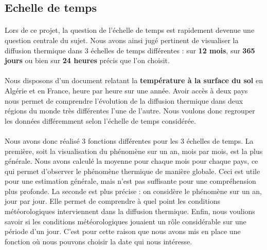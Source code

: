 \documentclass{article}
\begin{document}
\subsection{Echelle de temps}

\paragraph{}
Lors de ce projet, la question de l'échelle de temps est rapidement devenue une question centrale du sujet. Nous avons ainsi jugé pertinent de visualiser la diffusion thermique dans 3 échelles de temps différentes : sur \textbf{12 mois}, sur \textbf{365 jours} ou bien sur \textbf{24 heures} précis que l'on choisit.

\paragraph{}
Nous disposons d'un document relatant la \textbf{température à la surface du sol} en Algérie et en France, heure par heure sur une année. Avoir accès à deux pays nous permet de comprendre l'évolution de la diffusion thermique dans deux régions du monde très différentes l'une de l'autre. Nous voulons donc regrouper les données différemment selon l'échelle de temps considérée. 

\paragraph{}
Nous avons donc réalisé 3 fonctions différentes pour les 3 échelles de temps.
\newline
La première, soit la visualisation du phénomène sur un an, mois par mois, est la plus générale. Nous avons calculé la moyenne pour chaque mois pour chaque pays, ce qui permet d'observer le phénomène thermique de manière globale. Ceci est utile pour une estimation générale, mais n'est pas suffisante pour une compréhension plus profonde. 
\newline 
La seconde est plus précise : on considère le phénomène sur un an, jour par jour. Elle permet de comprendre à quel point les conditions météorologiques interviennent dans la diffusion thermique. 
\newline 
Enfin, nous voulions savoir si les conditions météorologiques jouaient un rôle considérable sur une période d'un jour. C'est pour cette raison que nous avons mis en place une fonction où nous pouvons choisir la date qui nous intéresse. 
\end{document}

